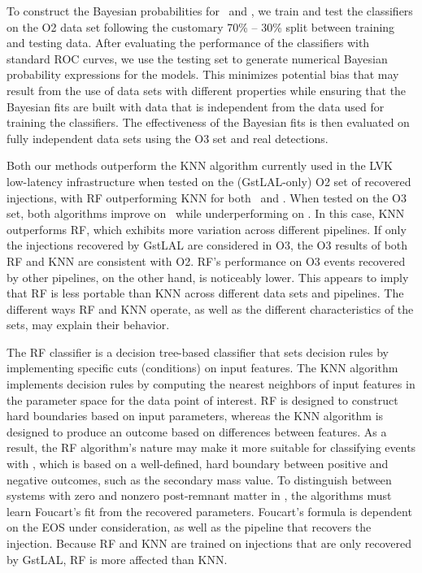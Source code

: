 To construct the Bayesian probabilities for \hasns\ and \hasrem, we train and test the classifiers on the \ac{O2} data set following the customary 70\% -- 30\% split between
training and testing data. After evaluating the performance of the classifiers with standard \ac{ROC} curves, we use the testing set to generate numerical Bayesian probability
expressions for the models. This minimizes potential bias that may result from the use of data sets with different properties while ensuring that the Bayesian fits are built with
data that is independent from the data used for training the classifiers. The effectiveness of the Bayesian fits is then evaluated on fully independent data sets using the
\ac{O3} set and real detections. 

Both our methods outperform the  \ac{KNN} algorithm  currently used in the \ac{LVK} low-latency infrastructure when tested on the (GstLAL-only) \ac{O2} set of recovered injections, with
\ac{RF} outperforming \ac{KNN} for both \hasns\ and \hasrem. When tested on the \ac{O3} set, both algorithms improve on \hasns\ while underperforming on \hasrem.  In this case,
\ac{KNN} outperforms \ac{RF}, which exhibits more variation across different pipelines.  If only the injections recovered by GstLAL are considered in \ac{O3}, the \ac{O3} results of
both \ac{RF} and \ac{KNN} are consistent with \ac{O2}. \ac{RF}'s performance on \ac{O3} events recovered by other pipelines, on the other hand, is noticeably lower. This appears to
imply that \ac{RF} is less portable than \ac{KNN} across different data sets and pipelines. The different ways \ac{RF} and \ac{KNN} operate, as well as the different characteristics
of the sets, may explain their behavior.

The RF classifier is a decision tree-based classifier that sets decision rules by implementing specific cuts (conditions) on input features. The \ac{KNN} algorithm implements decision rules by computing the nearest neighbors of input features in the parameter space for the data point of interest. \ac{RF} is designed to construct hard boundaries based on input parameters, whereas the \ac{KNN} algorithm is designed to produce an outcome based on differences between features. As a result, the \ac{RF} algorithm's nature may make it more suitable for classifying events with \hasns, which is based on a well-defined, hard boundary between positive and negative outcomes, such as the secondary mass value. To distinguish between systems with zero and nonzero post-remnant matter in \hasrem, the algorithms must learn Foucart's fit from the recovered parameters. Foucart's formula is dependent on the \ac{EOS} under consideration, as well as the pipeline that recovers the injection. Because \ac{RF} and \ac{KNN} are trained on injections that are only recovered by GstLAL, \ac{RF} is more affected than \ac{KNN}.

